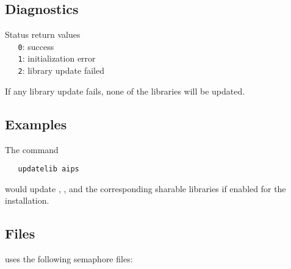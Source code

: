 \subsection*{Diagnostics}

Status return values
\\ \verb+   0+: success
\\ \verb+   1+: initialization error
\\ \verb+   2+: library update failed

\noindent
If any library update fails, none of the libraries will be updated.

\subsection*{Examples}

The command

\begin{verbatim}
   updatelib aips
\end{verbatim}

\noindent
would update , , and the
corresponding sharable libraries if enabled for the installation.

\subsection*{Files}

 uses the following semaphore files:

